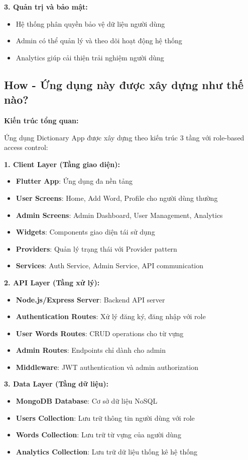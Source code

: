 \documentclass[12pt,a4paper]{article}
\begin{document}
\textbf{3. Quản trị và bảo mật:}
\begin{itemize}
    \item Hệ thống phân quyền bảo vệ dữ liệu người dùng
    \item Admin có thể quản lý và theo dõi hoạt động hệ thống
    \item Analytics giúp cải thiện trải nghiệm người dùng
\end{itemize}

\subsection{How - Ứng dụng này được xây dựng như thế nào?}

\textbf{Kiến trúc tổng quan:}

Ứng dụng Dictionary App được xây dựng theo kiến trúc 3 tầng với role-based access control:

\textbf{1. Client Layer (Tầng giao diện):}
\begin{itemize}
    \item \textbf{Flutter App}: Ứng dụng đa nền tảng
    \item \textbf{User Screens}: Home, Add Word, Profile cho người dùng thường
    \item \textbf{Admin Screens}: Admin Dashboard, User Management, Analytics
    \item \textbf{Widgets}: Components giao diện tái sử dụng
    \item \textbf{Providers}: Quản lý trạng thái với Provider pattern
    \item \textbf{Services}: Auth Service, Admin Service, API communication
\end{itemize}

\textbf{2. API Layer (Tầng xử lý):}
\begin{itemize}
    \item \textbf{Node.js/Express Server}: Backend API server
    \item \textbf{Authentication Routes}: Xử lý đăng ký, đăng nhập với role
    \item \textbf{User Words Routes}: CRUD operations cho từ vựng
    \item \textbf{Admin Routes}: Endpoints chỉ dành cho admin
    \item \textbf{Middleware}: JWT authentication và admin authorization
\end{itemize}

\textbf{3. Data Layer (Tầng dữ liệu):}
\begin{itemize}
    \item \textbf{MongoDB Database}: Cơ sở dữ liệu NoSQL
    \item \textbf{Users Collection}: Lưu trữ thông tin người dùng với role
    \item \textbf{Words Collection}: Lưu trữ từ vựng của người dùng
    \item \textbf{Analytics Collection}: Lưu trữ dữ liệu thống kê hệ thống
\end{itemize}
\end{document}
